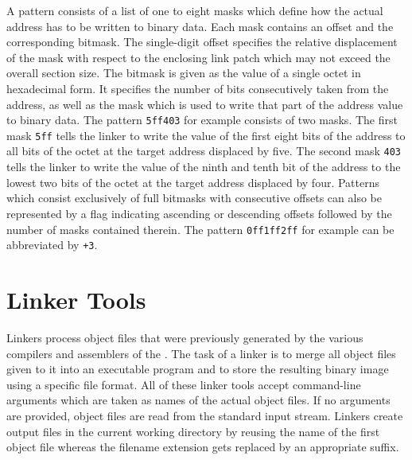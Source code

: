 A pattern consists of a list of one to eight masks which define how the actual address has to be written to binary data.
Each mask contains an offset and the corresponding bitmask.
The single-digit offset specifies the relative displacement of the mask with respect to the enclosing link patch which may not exceed the overall section size.
The bitmask is given as the value of a single octet in hexadecimal form.
It specifies the number of bits consecutively taken from the address, as well as the mask which is used to write that part of the address value to binary data.
The pattern \texttt{5ff403} for example consists of two masks.
The first mask \texttt{5ff} tells the linker to write the value of the first eight bits of the address to all bits of the octet at the target address displaced by five.
The second mask \texttt{403} tells the linker to write the value of the ninth and tenth bit of the address to the lowest two bits of the octet at the target address displaced by four.
Patterns which consist exclusively of full bitmasks with consecutive offsets can also be represented by a flag indicating ascending or descending offsets followed by the number of masks contained therein.
The pattern \texttt{0ff1ff2ff} for example can be abbreviated by \texttt{+3}.

\section{Linker Tools}

Linkers process object files that were previously generated by the various compilers and assemblers of the \ecs{}.
The task of a linker is to merge all object files given to it into an executable program and to store the resulting binary image using a specific file format.
All of these linker tools accept command-line arguments which are taken as names of the actual object files.
If no arguments are provided, object files are read from the standard input stream.
Linkers create output files in the current working directory by reusing the name of the first object file whereas the filename extension gets replaced by an appropriate suffix.
\seeinterface\seeguide

\linklib
\linkbin
\linkmem
\linkhex
\linkprg
\mapsearch

\concludechapter
